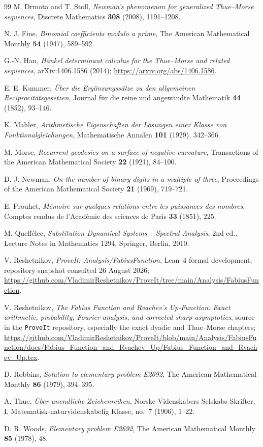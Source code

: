 \documentclass[11pt,oneside]{article}
\theoremstyle{definition}
\theoremstyle{remark}
\begin{document}
\begin{thebibliography}{99}
M. Drmota and T. Stoll,
\emph{Newman's phenomenon for generalized Thue--Morse sequences},
Discrete Mathematics \textbf{308} (2008), 1191--1208.

N. J. Fine,
\emph{Binomial coefficients modulo a prime},
The American Mathematical Monthly \textbf{54} (1947), 589--592.

G.-N. Han,
\emph{Hankel determinant calculus for the Thue--Morse and related sequences},
arXiv:1406.1586 (2014);
\url{https://arxiv.org/abs/1406.1586}.

E. E. Kummer,
\emph{\"Uber die Erg\"anzungss\"atze zu den allgemeinen Reciprocit\"atsgesetzen},
Journal f\"ur die reine und angewandte Mathematik \textbf{44} (1852), 93--146.

K. Mahler,
\emph{Arithmetische Eigenschaften der L\"osungen einer Klasse von Funktionalgleichungen},
Mathematische Annalen \textbf{101} (1929), 342--366.

M. Morse,
\emph{Recurrent geodesics on a surface of negative curvature},
Transactions of the American Mathematical Society \textbf{22} (1921), 84--100.

D. J. Newman,
\emph{On the number of binary digits in a multiple of three},
Proceedings of the American Mathematical Society \textbf{21} (1969), 719--721.

E. Prouhet,
\emph{M\'emoire sur quelques relations entre les puissances des nombres},
Comptes rendus de l'Acad\'emie des sciences de Paris \textbf{33} (1851), 225.

M. Queff\'elec,
\emph{Substitution Dynamical Systems -- Spectral Analysis},
2nd ed., Lecture Notes in Mathematics 1294, Springer, Berlin, 2010.

V. Reshetnikov,
\emph{ProveIt: Analysis/FabiusFunction}, Lean~4 formal development,
repository snapshot consulted 26 August 2026;
\url{https://github.com/VladimirReshetnikov/ProveIt/tree/main/Analysis/FabiusFunction}.

V. Reshetnikov,
\emph{The Fabius Function and Rvachev's Up-Function: Exact arithmetic, probability,
Fourier analysis, and corrected sharp asymptotics},
source in the \texttt{ProveIt} repository, especially the exact dyadic and
Thue--Morse chapters;
\url{https://github.com/VladimirReshetnikov/ProveIt/blob/main/Analysis/FabiusFunction/docs/Fabius_Function_and_Rvachev_Up/Fabius_Function_and_Rvachev_Up.tex}.

D. Robbins,
\emph{Solution to elementary problem E2692},
The American Mathematical Monthly \textbf{86} (1979), 394--395.

A. Thue,
\emph{\"Uber unendliche Zeichenreihen},
Norske Videnskabers Selskabs Skrifter, I. Matematisk-naturvidenskabelig Klasse,
no.~7 (1906), 1--22.

D. R. Woods,
\emph{Elementary problem E2692},
The American Mathematical Monthly \textbf{85} (1978), 48.

\end{thebibliography}
\end{document}
